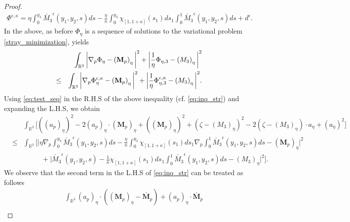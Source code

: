 \documentclass{article}
\def \Mvec{\mathbf{M}}
\begin{document}
\begin{proof}
\begin{eqnarray}
\Phi^{\epsilon,\kappa}=\eta\int_{0}^{y_3}{\check{M_3}}^{\epsilon}\left(y_1, y_2, s\right)ds-\frac{\eta}{\kappa}\int_{0}^{y_3}\chi_{[1, 1+\kappa]}\left(s_1\right)ds_1\int_{0}^{1}{\check{M_3}}^{\epsilon}\left(y_1, y_2, s\right)ds + d^{\epsilon}.\label{eq:test_seq}
\end{eqnarray}
In the above, 
as before $\Phi_{\eta}$ is a sequence of solutions to the variational problem \eqref{stray_minimization}, yields
\begin{eqnarray}
& &\int_{\mathbb R^3}\bigg|\nabla_p\Phi_{\eta}-\left(\Mvec_p\right)_{\eta}\bigg|^2 + \bigg|\frac{1}{\eta}\Phi_{\eta,3}-\left(M_3\right)_{\eta}\bigg|^2\nonumber\newline\\
&\le&\int_{\mathbb R^3}\bigg|\nabla_p\Phi^{\epsilon,\kappa}_{\eta}-\left(\Mvec_p\right)_{\eta}\bigg|^2 + \bigg|\frac{1}{\eta}\Phi^{\epsilon,\kappa}_{\eta,3}-\left(M_3\right)_{\eta}\bigg|^2.\label{eq:inq_str}
\end{eqnarray}
Using \eqref{eq:test_seq} in the R.H.S of the above inequality (cf. \eqref{eq:inq_str}) and expanding the L.H.S, we obtain
\begin{eqnarray}
& &\int_{\mathbb R^3}\biggl[\left(\left(a_p\right)_{\eta}\right)^2-2\left(a_p\right)_{\eta}\cdot\left(\Mvec_p\right)_{\eta}+\left(\left(\Mvec_p\right)_{\eta}\right)^2+\left(\zeta-\left(M_3\right)_{\eta}\right)^2-2\left(\zeta-\left(M_3\right)_{\eta}\right)\cdot a_{\eta} + \left(a_{\eta}\right)^2\biggr]\nonumber\\
&\le&\int_{\mathbb R^3}\biggl[\bigg|\eta\nabla_p\int_{0}^{y_3}{\check{M_3}}^{\epsilon}\left(y_1, y_2, s\right)ds-\frac{\eta}{\kappa}\int_{0}^{y_3}\chi_{[1, 1+\kappa]}\left(s_1\right)ds_1\nabla_p\int_{0}^{1}{\check{M_3}}^{\epsilon}\left(y_1, y_2, s\right)ds-\left(\Mvec_p\right)_{\eta}\bigg|^2\nonumber\\
& &~~~~~~~~~~~~+\bigg|{\check{M_3}}^{\epsilon}\left(y_1, y_2, s\right)-\frac{1}{\kappa}\chi_{[1, 1+\kappa]}\left(s_1\right)ds_1\int_{0}^{1}{\check{M_3}}^{\epsilon}\left(y_1, y_2, s\right)ds-\left(M_3\right)_{\eta}\bigg|^2\biggr].\label{eq:inq_first}
\end{eqnarray}
We observe that the second term in the L.H.S of \eqref{eq:inq_str} can be treated as follows
\begin{eqnarray}
& &\int_{\mathbb R^3}\left(a_p\right)_{\eta}\cdot\left(\left(\Mvec_p\right)_{\eta}-\check{\Mvec_p}\right) + \left(a_p\right)_{\eta}\cdot\check{\Mvec_p}\nonumber\\

\end{eqnarray}
\end{proof}
\end{document}
